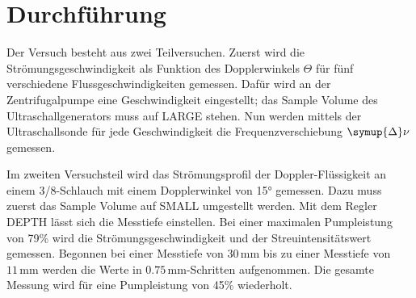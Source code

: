 \section{Durchführung}
\label{sec:Durchführung}

Der Versuch besteht aus zwei Teilversuchen. Zuerst wird die Strömungsgeschwindigkeit als Funktion des Dopplerwinkels $\Theta$ für fünf verschiedene
Flussgeschwindigkeiten gemessen. Dafür wird an der Zentrifugalpumpe eine Geschwindigkeit eingestellt; das Sample Volume des Ultraschallgenerators 
muss auf LARGE stehen. Nun werden mittels der Ultraschallsonde für jede Geschwindigkeit die Frequenzverschiebung $\symup{\Delta} \nu$ gemessen.

Im zweiten Versuchsteil wird das Strömungsprofil der Doppler-Flüssigkeit an einem 3/8-Schlauch mit einem Dopplerwinkel von 15° gemessen. Dazu muss zuerst 
das Sample Volume auf SMALL umgestellt werden. Mit dem Regler DEPTH lässt sich die Messtiefe einstellen. Bei einer maximalen Pumpleistung von 79\% 
wird die Strömungsgeschwindigkeit und der Streuintensitätswert gemessen. Begonnen bei einer Messtiefe von $30\,\unit{\milli\meter}$ bis zu einer 
Messtiefe von $11\,\unit{\milli\meter}$ werden die Werte in $0.75\,\unit{\milli\meter}$-Schritten aufgenommen. Die gesamte Messung wird für eine 
Pumpleistung von 45\% wiederholt.